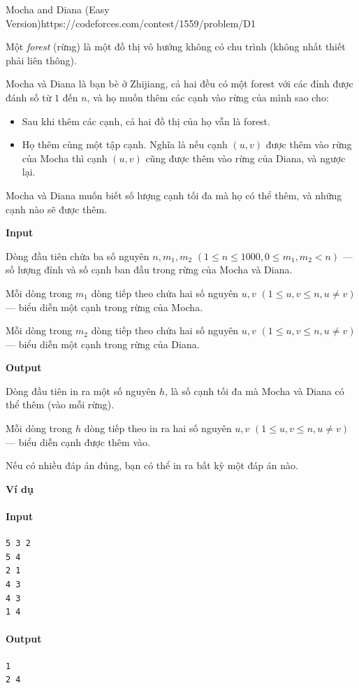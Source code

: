 \begin{baitap}{Mocha and Diana (Easy Version)}{https://codeforces.com/contest/1559/problem/D1}

Một \emph{forest} (rừng) là một đồ thị vô hướng không có chu trình (không nhất thiết phải liên thông).  

Mocha và Diana là bạn bè ở Zhijiang, cả hai đều có một forest với các đỉnh được đánh số từ $1$ đến $n$, và họ muốn thêm các cạnh vào rừng của mình sao cho:  

\begin{itemize}
    \item Sau khi thêm các cạnh, cả hai đồ thị của họ vẫn là forest.
    \item Họ thêm cùng một tập cạnh. Nghĩa là nếu cạnh $(u,v)$ được thêm vào rừng của Mocha thì cạnh $(u,v)$ cũng được thêm vào rừng của Diana, và ngược lại.
\end{itemize}

Mocha và Diana muốn biết số lượng cạnh tối đa mà họ có thể thêm, và những cạnh nào sẽ được thêm.  

\textbf{Input}  

Dòng đầu tiên chứa ba số nguyên $n, m_1, m_2$ $(1 \leq n \leq 1000, 0 \leq m_1, m_2 < n)$ — số lượng đỉnh và số cạnh ban đầu trong rừng của Mocha và Diana.  

Mỗi dòng trong $m_1$ dòng tiếp theo chứa hai số nguyên $u, v$ $(1 \leq u, v \leq n, u \neq v)$ — biểu diễn một cạnh trong rừng của Mocha.  

Mỗi dòng trong $m_2$ dòng tiếp theo chứa hai số nguyên $u, v$ $(1 \leq u, v \leq n, u \neq v)$ — biểu diễn một cạnh trong rừng của Diana.

\textbf{Output}

Dòng đầu tiên in ra một số nguyên $h$, là số cạnh tối đa mà Mocha và Diana có thể thêm (vào mỗi rừng).  

Mỗi dòng trong $h$ dòng tiếp theo in ra hai số nguyên $u, v$ $(1 \leq u, v \leq n, u \neq v)$ — biểu diễn cạnh được thêm vào.  

Nếu có nhiều đáp án đúng, bạn có thể in ra bất kỳ một đáp án nào.

\textbf{Ví dụ}
\paragraph{Input}
\begin{lstlisting}
5 3 2
5 4
2 1
4 3
4 3
1 4
\end{lstlisting}

\paragraph{Output}
\begin{lstlisting}
1
2 4
\end{lstlisting}
\end{baitap}

